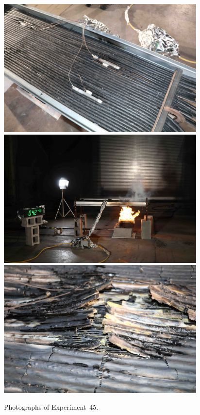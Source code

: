 \documentclass[12pt]{article}
\begin{document}
\begin{figure}[p]
\centering
\includegraphics[height=2.75in]{../FIGURES/Test_45_setup} \\
\includegraphics[height=2.75in]{../FIGURES/Test_45_42_min_46_s} \\
\includegraphics[height=2.75in]{../FIGURES/Test_45_damage}
\caption[Photographs of Experiment~45]{Photographs of Experiment~45.}
\label{fig:Test_45_photos}
\end{figure}


\clearpage
\end{document}
